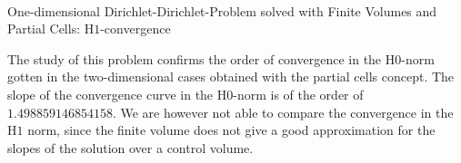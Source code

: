 \documentclass[a4paper,12pt]{article}
\makeatletter
\newenvironment{figurehere}
  {\def\@captype{figure}}
  {}
\makeatother
\begin{document}
\begin{center}
\begin{figurehere}
\\
\caption{One-dimensional Dirichlet-Dirichlet-Problem solved with Finite Volumes and Partial Cells: H$1$-convergence}\label{fig:fvdirichlet1dH1}
\end{figurehere}
\end{center}
The study of this problem confirms the order of convergence in the H$0$-norm gotten in the two-dimensional cases obtained with the partial cells concept. The slope of the convergence curve in the H$0$-norm is of the order of $1.498859146854158$. We are however not able to compare
the convergence in the H$1$ norm, since the finite volume does not give a good approximation for the slopes of the solution
over a control volume.
\end{document}
